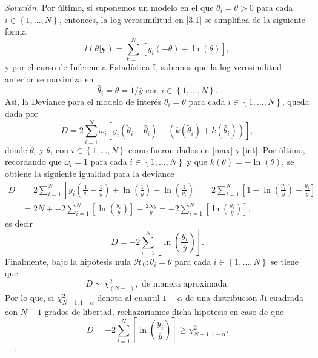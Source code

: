 \documentclass[10.5pt,notitlepage]{article}
\newenvironment{solucion}
  {\begin{proof}[Solución]}
  {\end{proof}}
\newcommand{\corch}[1]{\left[ #1 \right]}
\newcommand{\kis}[1]{\left\{ #1 \right\}}
\newcommand{\pare}[1]{\left( #1 \right)}
\theoremstyle{plain}
\begin{document}
\begin{solucion}
Por último, si suponemos un modelo en el que \(\theta_i = \theta >0\) para cada \(i \in \kis{1, \hdots, N}\), entonces, la log-verosimilitud en \eqref{3.1} se simplifica de la siguiente forma 
\[
l(\theta|\mathbf{y}) =  \sum_{k=1}^{N}\corch{y_i(-\theta) + \ln(\theta)},
\]
y por el curso de Inferencia Estadística I, sabemos que la log-verosimilitud anterior se maximiza en 
\begin{equation}\label{int}
    \hat{\theta}_i = \hat{\theta} = 1/\overline{y} \text{ con } i \in \kis{1, \hdots, N}.
\end{equation}
Así, la Deviance para el modelo de interés \(\theta_i = \theta\) para cada \(i \in \kis{1, \hdots, N}\), queda dada por 
\begin{equation*}
    D = 2\sum_{i = 1}^{N}\omega_i\corch{y_i(\tilde{\theta}_i - \hat{\theta}_i) -(k(\tilde{\theta}_i) + k(\hat{\theta}_i))},
\end{equation*}
donde \(\hat{\theta}_i\) y \(\tilde{\theta}_i\) con \(i\in \kis{1, \hdots, N}\) como fueron dados en \eqref{max} y \eqref{int}. Por último, recordando que \(\omega_i = 1\) para cada \(i \in \kis{1,\hdots, N}\) y que \(k(\theta) = -\ln(\theta)\), se obtiene la siguiente igualdad para la deviance 
\begin{align*}
      D &= 2\sum_{i = 1}^{N}\corch{y_i\pare{\frac{1}{y_i} - \frac{1}{\overline{y}}}+ \ln\pare{\frac{1}{\overline{y}}} - \ln\pare{\frac{1}{y_i}}}= 2\sum_{i = 1}^{N}\corch{1 - \ln\pare{\frac{y_i}{\overline{y}}} - \frac{y_i}{\overline{y}}}\\ 
      &=  2N + -2\sum_{i = 1}^{N}\corch{\ln\pare{\frac{y_i}{\overline{y}}}} - \frac{2N \overline{y}}{\overline{y}} = -2\sum_{i = 1}^{N}\corch{\ln\pare{\frac{y_i}{\overline{y}}}},
\end{align*}
es decir 
\[
D = -2\sum_{i = 1}^{N}\corch{\ln\pare{\frac{y_i}{\overline{y}}}}.
\]
Finalmente, bajo la hipótesis nula \(\mathcal{H}_0: \theta_i = \theta\) para cada \(i\in \kis{1,\hdots,N}\) se tiene que 
\[
D \sim \chi_{(N-1)}^{2}, \text{ de manera aproximada.}
\]
Por lo que, si \(\chi_{N-1, 1 - \alpha}^{2}\) denota al cuantil \(1- \alpha\) de una distribución Ji-cuadrada con \(N-1\) grados de libertad, rechazariamos dicha hipotesis en caso de que 
\[
D = -2\sum_{i = 1}^{N}\corch{\ln\pare{\frac{y_i}{\overline{y}}}}\geq \chi_{N-1, 1 - \alpha}^{2}.
\]
\end{solucion}
\end{document}
